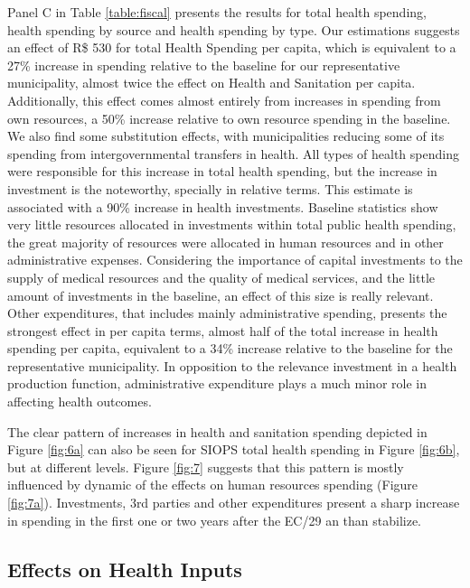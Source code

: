 Panel C in Table \ref{table:fiscal} presents the results for total health spending, health spending by source and health spending by type. Our estimations suggests an effect of R\$ 530 for total Health Spending per capita, which is equivalent to a 27\% increase in spending relative to the baseline for our representative municipality, almost twice the effect on Health and Sanitation per capita. Additionally, this effect comes almost entirely from increases in spending from own resources, a 50\% increase relative to own resource spending in the baseline. We also find some substitution effects, with municipalities reducing some of its spending from intergovernmental transfers in health. All types of health spending were responsible for this increase in total health spending, but the increase in investment is the noteworthy, specially in relative terms. This estimate is associated with a 90\% increase in health investments. Baseline statistics show very little resources allocated in investments within total public health spending, the great majority of resources were allocated in human resources and in other administrative expenses. Considering the importance of capital investments to the supply of medical resources and the quality of medical services, and the little amount of investments in the baseline, an effect of this size is really relevant. Other expenditures, that includes mainly administrative spending, presents the strongest effect in per capita terms, almost half of the total increase in health spending per capita, equivalent to a 34\% increase relative to the baseline for the representative municipality. In opposition to the relevance investment in a health production function, administrative expenditure plays a much minor role in affecting health outcomes.



The clear pattern of increases in health and sanitation spending depicted in Figure \ref{fig:6a} can also be seen for SIOPS total health spending in Figure \ref{fig:6b}, but at different levels. Figure \ref{fig:7} suggests that this pattern is mostly influenced by dynamic of the effects on human resources spending (Figure \ref{fig:7a}). Investments, 3rd parties and other expenditures present a sharp increase in spending in the first one or two years after the EC/29 an than stabilize.


\subsection{Effects on Health Inputs}

